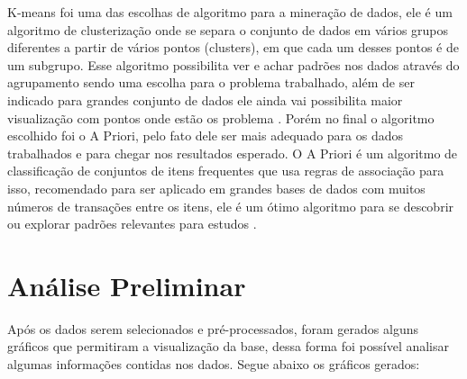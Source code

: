 \documentclass[tcc1]{uftex}
\begin{document}
	
	K-means foi uma das escolhas de algoritmo para a mineração de dados, ele é um algoritmo de clusterização onde se separa o conjunto de dados em vários grupos diferentes a partir de vários pontos (clusters), em que cada um desses pontos é de um subgrupo. Esse algoritmo possibilita ver e achar padrões nos dados através do agrupamento sendo uma escolha para o problema trabalhado, além de ser indicado para grandes conjunto de dados ele ainda vai possibilita maior visualização com pontos onde estão os problema \cite{kmeans}. Porém no final o algoritmo escolhido foi o A Priori, pelo fato dele ser mais adequado para os dados trabalhados e para chegar nos resultados esperado. O A Priori é um algoritmo de classificação de conjuntos de itens frequentes que usa regras de associação para isso, recomendado para ser aplicado em grandes bases de dados com muitos números de transações entre os itens, ele é um ótimo algoritmo para se descobrir ou explorar padrões relevantes para estudos \cite{agrawal1993mining}.







\chapter{Análise Preliminar}

Após os dados serem selecionados e pré-processados, foram gerados alguns gráficos que permitiram a visualização da base, dessa forma foi possível analisar algumas informações contidas nos dados. Segue abaixo os gráficos gerados:
\end{document}
